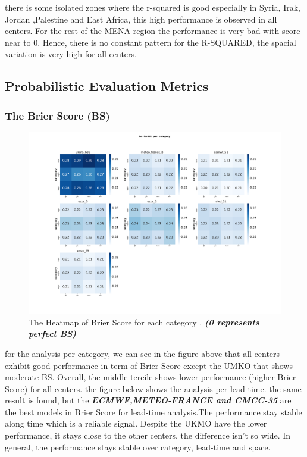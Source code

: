 there is some isolated zones where the r-squared is good especially in Syria, Irak, Jordan ,Palestine  and East Africa, this high performance is observed in all centers. For the rest of the MENA region the performance is very bad with score near to 0. Hence, there is no constant pattern for the R-SQUARED, the spacial variation is very high for all centers.


\subsection{Probabilistic Evaluation Metrics}

\subsubsection{The Brier Score (BS)}

\begin{figure}[H]
    \centering
    \includegraphics[scale=0.25]{plots/prob/bs/bs_RR_category.png}
    \caption{The Heatmap of Brier Score for each category  . \textbf{\textit{(0 represents perfect BS)}}}
\end{figure}

for the analysis per category, we can see in the figure above that all centers exhibit good performance in term of Brier Score except the UMKO that shows moderate BS. Overall, the middle tercile shows lower performance (higher Brier Score) for all centers. 
the figure below shows the analysis per lead-time. the same result is found, but the \textbf{\textit{ECMWF,METEO-FRANCE and CMCC-35}} are the best models in Brier Score for lead-time analysis.The performance stay stable along time which is a reliable signal. Despite the UKMO have the lower performance, it stays close to the other centers, the difference isn't so wide. 
In general, the performance stays stable over category, lead-time and space.


